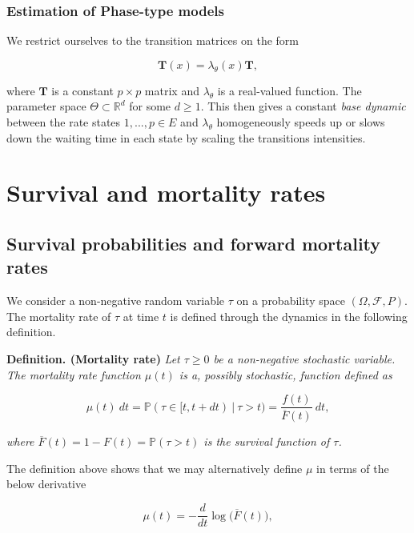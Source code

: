 \documentclass[
]{book}
\begin{document}
\hypertarget{estimation-of-phase-type-models}{%
\subsubsection{Estimation of Phase-type models}\label{estimation-of-phase-type-models}}

We restrict ourselves to the transition matrices on the form

\[
\mathbf T(x)=\lambda_\theta(x)\mathbf T,
\]

where \(\mathbf T\) is a constant \(p\times p\) matrix and \(\lambda_\theta\) is a real-valued function. The parameter space \(\Theta\subset \mathbb R^d\) for some \(d\ge 1\). This then gives a constant \emph{base dynamic} between the rate states \(1,...,p\in E\) and \(\lambda_\theta\) homogeneously speeds up or slows down the waiting time in each state by scaling the transitions intensities.

\hypertarget{survival-and-mortality-rates}{%
\section{Survival and mortality rates}\label{survival-and-mortality-rates}}

\hypertarget{survival-probabilities-and-forward-mortality-rates}{%
\subsection{Survival probabilities and forward mortality rates}\label{survival-probabilities-and-forward-mortality-rates}}

We consider a non-negative random variable \(\tau\) on a probability space \((\Omega,\mathcal F, P)\). The mortality rate of \(\tau\) at time \(t\) is defined through the dynamics in the following definition.

\textbf{Definition. (Mortality rate)} \emph{Let \(\tau\ge 0\) be a non-negative stochastic variable. The mortality rate function \(\mu(t)\) is a, possibly stochastic, function defined as}

\[
\mu(t)\ dt=\mathbb P(\tau\in[t,t+dt)\ \vert\ \tau > t)=\frac{f(t)}{\overline F(t)}\ dt,
\]

\emph{where \(\overline F(t)=1-F(t)=\mathbb P(\tau >t)\) is the survival function of \(\tau\).}

The definition above shows that we may alternatively define \(\mu\) in terms of the below derivative

\[
\mu(t)=-\frac{d}{dt}\log\Big(\overline F(t)\Big),
\]
\end{document}
